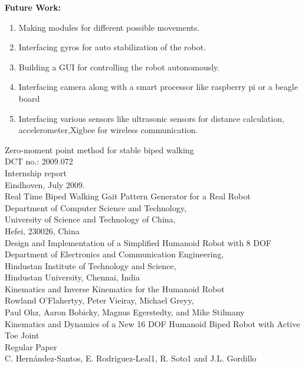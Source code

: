 \documentclass{article}
\begin{document}
\hspace{-5mm}\textbf{Future Work:}
\begin{enumerate}
	\item Making modules for different possible movements.
	\item Interfacing gyros for auto stabilization of the robot.
	\item Building a GUI for controlling the robot autonomously.
	\item Interfacing camera along with a smart processor like raspberry pi or a beagle board
	\item Interfacing various sensors like ultrasonic sensors for distance calculation, accelerometer,Xigbee for wireless communication.
\end{enumerate}
\begin{thebibliography}{99}
	 Zero-moment point method for stable biped walking\\
	DCT no.: 2009.072\\
	Internship report\\
	Eindhoven, July 2009.\\
	
	 Real Time Biped Walking Gait Pattern Generator for a Real Robot\\
	Department of Computer Science and Technology,\\
	University of Science and Technology of China,\\
	Hefei, 230026, China\\
	
	 Design and Implementation of a Simplified Humanoid Robot with 8 DOF\\
	Department of Electronics and Communication Engineering,\\ Hindustan Institute of
	Technology and Science,\\ Hindustan University, Chennai, India\\
	
	 Kinematics and Inverse Kinematics for the Humanoid Robot\\
	Rowland O’Flahertyy, Peter Vieiray, Michael Greyy,\\
	Paul Ohz, Aaron Bobicky, Magnus Egerstedty, and Mike Stilmany\\
	
	 Kinematics and Dynamics of a New 16 DOF Humanoid Biped Robot with Active Toe Joint\\
	Regular Paper\\
	C. Hernández-Santos, E. Rodriguez-Leal1, R. Soto1 and J.L. Gordillo\\
	

\end{thebibliography}
\end{document}
